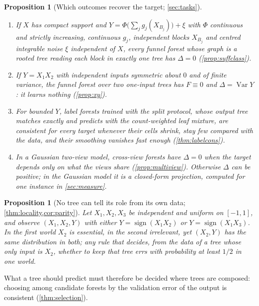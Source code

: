 \documentclass[11pt]{article}
\newtheorem{proposition}[theorem]{Proposition}
\theoremstyle{definition}
\theoremstyle{remark}
\newcommand{\Var}{\operatorname{Var}}
\begin{document}
\begin{proposition}[Which outcomes recover the target; \cref{sec:tasks}]\label{prop:tasks}
\leavevmode
\begin{enumerate}[label=(\alph*),leftmargin=*,noitemsep]
\item If $X$ has compact support and $Y=\Phi\bigl(\sum_jg_j(X_{B_j})\bigr)+\xi$ with $\Phi$
  continuous and strictly increasing, continuous $g_j$, independent blocks $X_{B_j}$ and
  centred integrable noise $\xi$ independent of $X$, every
  funnel forest whose graph is a rooted tree reading each block in exactly one tree has
  $\Delta=0$ (\cref{prop:suffclass}).
\item If $Y=X_1X_2$ with independent inputs symmetric about $0$ and of finite variance, the funnel forest over two
  one-input trees has $F\equiv0$ and $\Delta=\Var Y$: it learns nothing (\cref{prop:xy}).
\item For bounded $Y$, label forests trained with the split protocol, whose output tree
  matches exactly and predicts with the count-weighted leaf mixture, are consistent for every
  target whenever their cells shrink, stay few compared with the data, and their smoothing
  vanishes fast enough (\cref{thm:labelcons}).
\item In a Gaussian two-view model, cross-view forests have $\Delta=0$ when the target
  depends only on what the views share (\cref{prop:multiview}).  Otherwise $\Delta$ can be
  positive; in the Gaussian model it is a closed-form projection, computed for one instance in
  \cref{sec:measure}.
\end{enumerate}
\end{proposition}

\begin{proposition}[No tree can tell its role from its own data;
\cref{thm:locality,cor:parity}]\label{prop:local}
Let $X_1,X_2,X_3$ be independent and uniform on $[-1,1]$, and observe $(X_1,X_2,Y)$ with
either $Y=\operatorname{sign}(X_1X_2)$ or $Y=\operatorname{sign}(X_1X_3)$.  In the first world
$X_2$ is essential, in the second irrelevant, yet $(X_2,Y)$ has the same distribution in
both; any rule that decides, from the data of a tree whose only input is $X_2$, whether to
keep that tree errs with probability at least $1/2$ in one world.
\end{proposition}

What a tree should predict must therefore be decided where trees are composed: choosing
among candidate forests by the validation error of the output is consistent
(\cref{thm:selection}).
\end{document}
